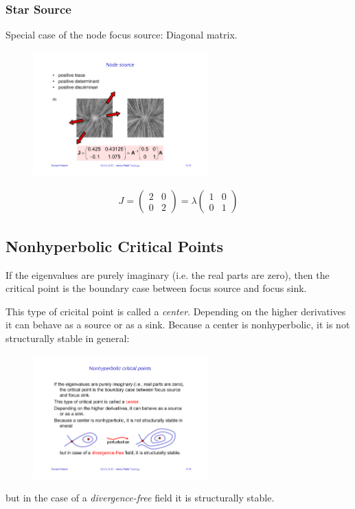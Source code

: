 \subsubsection{Star Source}
Special case of the node focus source: Diagonal matrix.
\begin{figure}[H]
    \centering
    \includegraphics[width=0.6\textwidth,page=7]{img/08_2d_critical_points}
\end{figure}
\begin{align*}
J = \begin{pmatrix}
     2 & 0\\
     0 & 2
 \end{pmatrix}
 = \lambda
     \begin{pmatrix}
        1 & 0\\
         0 & 1
     \end{pmatrix}
\end{align*}

\subsection{Nonhyperbolic Critical Points}
If the eigenvalues are purely imaginary (i.e. the real parts are zero), then the critical point is the boundary case between focus source and focus sink.

This type of cricital point is called a \emph{center}. Depending on the higher derivatives it can behave as a source or as a sink. Because a center is nonhyperbolic, it is not structurally stable in general:
\begin{figure}[H]
    \centering
    \includegraphics[width=0.6\textwidth]{img/08_nonhyperbolic_pertubation}
\end{figure}
but in the case of a \emph{divergence-free} field it is structurally stable.
